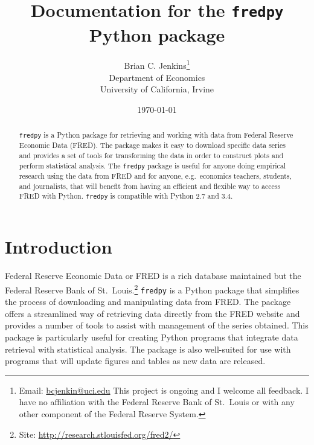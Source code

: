 \documentclass[11pt,fleqn]{article}
\newcommand{\ttt}{\texttt}
\begin{document}
\begin{titlepage}
\title{Documentation for the \ttt{fredpy} Python package}
\author{Brian C. Jenkins\thanks{Email: \href{mailto:bcjenkin@uci.edu}{bcjenkin@uci.edu} This project is ongoing and I welcome all feedback. I have no affiliation with the Federal Reserve Bank of St.~Louis or with any other component of the Federal Reserve System.}\\Department of Economics \\University of California, Irvine}
\date{\today}

\maketitle

\begin{abstract}
\noindent \ttt{fredpy} is a Python package for retrieving and working with data from Federal Reserve Economic Data (FRED). The package makes it easy to download specific data series and provides a set of tools for transforming the data in order to construct plots and perform statistical analysis. The \ttt{fredpy} package is useful for anyone doing empirical research using the data from FRED and for anyone, e.g.~economics teachers, students, and journalists, that will benefit from having an efficient and flexible way to access FRED with Python. \ttt{fredpy} is compatible with Python 2.7 and 3.4.
\end{abstract}

\thispagestyle{empty}
\end{titlepage}

\tableofcontents

\newpage

\section{Introduction}

Federal Reserve Economic Data or FRED is a rich database maintained but the Federal Reserve Bank of St.~Louis.\footnote{Site: \href{http://research.stlouisfed.org/fred2/}{http://research.stlouisfed.org/fred2/}} \verb=fredpy= is a Python package that simplifies the process of downloading and manipulating data from FRED. The package offers a streamlined way of retrieving data directly from the FRED website and provides a number of tools to assist with management of the series obtained. This package is particularly useful for creating Python programs that integrate data retrieval with statistical analysis. The package is also well-suited for use with programs that will update figures and tables as new data are released.
\end{document}
